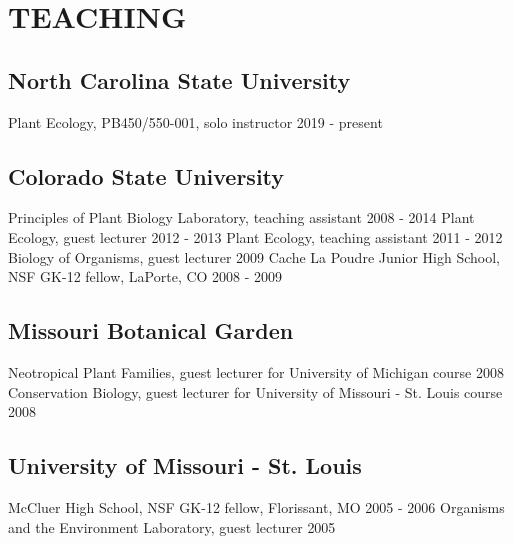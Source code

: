 \documentclass[11pt,english]{article}\usepackage[]{graphicx}\usepackage[]{color}
\begin{document}
\section*{TEACHING}

\subsection*{North Carolina State University}
Plant Ecology, PB450/550-001, solo instructor \hfill {2019 - present} 


\subsection*{Colorado State University}
Principles of Plant Biology Laboratory, teaching assistant \hfill {2008 - 2014} \newline
Plant Ecology, guest lecturer \hfill {2012 - 2013} \newline
Plant Ecology, teaching assistant \hfill {2011 - 2012} \newline
Biology of Organisms, guest lecturer \hfill {2009} \newline
Cache La Poudre Junior High School, NSF GK-12 fellow, LaPorte, CO \hfill {2008 - 2009}

\subsection*{Missouri Botanical Garden}
Neotropical Plant Families, guest lecturer for University of Michigan course \hfill {2008} \newline
Conservation Biology, guest lecturer for University of Missouri - St. Louis course \hfill {2008} 

\subsection*{University of Missouri - St. Louis}
McCluer High School, NSF GK-12 fellow, Florissant, MO \hfill {2005 - 2006} \newline
Organisms and the Environment Laboratory, guest lecturer \hfill {2005} 
\end{document}

